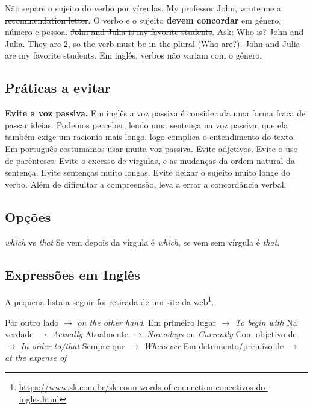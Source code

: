 \documentclass[openany]{book}
\begin{document}
\begin{outline}
    \1 Não separe o sujeito do verbo por vírgulas.
    \2 \sout{My professor John, wrote me a recommendation letter}.
    \1 O verbo e o sujeito \textbf{devem concordar} em gênero, número e pessoa.
    \2 \sout{John and Julia is my favorite students}.
        \3 Ask: Who is? John and Julia. They are 2, so the verb must be in the plural (Who are?).
    \2 John and Julia are my favorite students.
    \2 Em inglês, verbos não variam com o gênero.
\end{outline}

\subsection{Práticas a evitar}
\begin{outline}
\1 \textbf{Evite a voz passiva.}
\2 Em inglês a voz passiva é considerada uma forma fraca de passar ideias. Podemos perceber, lendo uma sentença na voz passiva, que ela também exige um racionío mais longo, logo complica o entendimento do texto. Em português costumamos usar muita voz passiva.
\1 Evite adjetivos.
\1 Evite o uso de parênteses.
\1 Evite o excesso de vírgulas, e as mudanças da ordem natural da sentença.
\1 Evite sentenças muito longas.
\1 Evite deixar o sujeito muito longe do verbo.
\2 Além de dificultar a compreensão, leva a errar a concordância verbal.
\end{outline}

\subsection{Opções}

\begin{outline}
\1 \textit{which} vs \textit{that}
\2 Se vem depois da vírgula é \textit{which}, se vem sem vírgula é \textit{that}.
\end{outline}

\subsection{Expressões em Inglês}

 A pequena lista a seguir foi retirada de um site da web\footnote{\url{https://www.sk.com.br/sk-conn-words-of-connection-conectivos-do-ingles.html}}.

\begin{outline}
    \1 Por outro lado $\rightarrow$ \textit{on the other hand}.
    \1 Em primeiro lugar $\rightarrow$ \textit{To begin with}
    \1 Na verdade    $\rightarrow$ \textit{Actually}
    \1 Atualmente    $\rightarrow$ \textit{Nowadays} ou \textit{Currently}
    \1 Com objetivo de $\rightarrow$ \textit{In order to/that}
    \1 Sempre que $\rightarrow$ \textit{Whenever}
    \1 Em detrimento/prejuízo de $\rightarrow$ \textit{at the expense of}
\end{outline}
\end{document}
